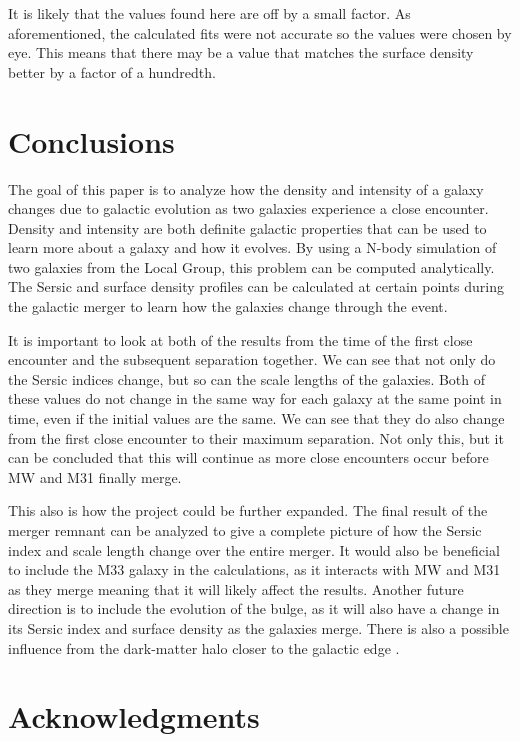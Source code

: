\documentclass[linenumbers,trackchanges,twocolumn]{aastex7}
\begin{document}
It is likely that the values found here are off by a small factor. As
aforementioned, the calculated fits were not accurate so the values were
chosen by eye. This means that there may be a value that matches the surface density better by a factor of a hundredth.

\section{Conclusions} \label{sec:style}

The goal of this paper is to analyze how the density and intensity of a galaxy
changes due to galactic evolution as two galaxies experience a close
encounter. Density and intensity are both definite galactic properties
that can be used to learn more about a galaxy and how it evolves. By
using a N-body simulation of two galaxies from the Local Group, this
problem can be computed analytically. The Sersic and surface
density profiles can be calculated at certain points during the
galactic merger to learn how the galaxies change through the event.

It is important to look at both of the results from the time of the first
close encounter and the subsequent separation together. We can see that
not only do the Sersic indices change, but so can the scale lengths of the
galaxies. Both of these values do not change in the same way for each
galaxy at the same point in time, even if the initial values are the same.
We can see that they do also change from the first close encounter to
their maximum separation. Not only this, but it can be concluded that this
will continue as more close encounters occur before MW and M31 finally
merge.

This also is how the project could be further expanded. The final result of the
merger remnant can be analyzed to give a complete picture of how the
Sersic index and scale length change over the entire merger. It would also
be beneficial to include the M33 galaxy in the calculations, as it
interacts with MW and M31 as they merge meaning that it will likely
affect the results. Another future direction is to include the evolution
of the bulge, as it will also have a change in its Sersic index and
surface density as the galaxies merge. There is also a possible influence from the dark-matter halo closer to the galactic edge
\citep{Takamiya_Sofue_2000}.

\section{Acknowledgments} \label{sec:style}
\end{document}
